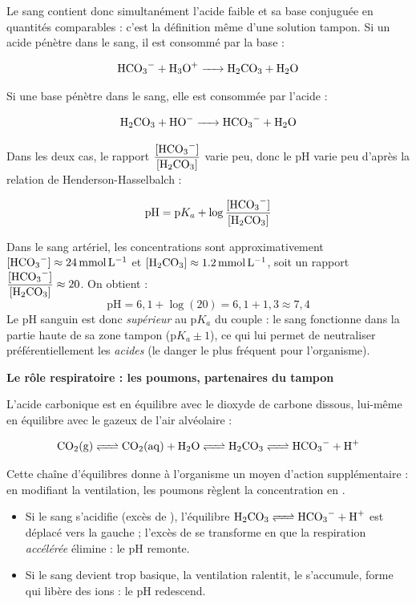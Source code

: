 \documentclass[11pt]{article}
\begin{document}
Le sang contient donc simultanément l'acide faible  et sa base conjuguée  en quantités comparables : c'est la définition même d'une solution tampon. Si un acide pénètre dans le sang, il est consommé par la base :

\[ \ce{HCO3- + H3O+ -> H2CO3 + H2O} \]

Si une base pénètre dans le sang, elle est consommée par l'acide :

\[ \ce{H2CO3 + HO- -> HCO3- + H2O} \]

Dans les deux cas, le rapport $\dfrac{[\ce{HCO3-}]}{[\ce{H2CO3}]}$ varie peu, donc le pH varie peu d'après la relation de Henderson-Hasselbalch :

\[ \mathrm{pH} = \mathrm{p}K_a + \log\frac{[\ce{HCO3-}]}{[\ce{H2CO3}]} \]

\begin{exemplebox}
Dans le sang artériel, les concentrations sont approximativement $[\ce{HCO3-}] \approx \SI{24}{mmol.L^{-1}}$ et $[\ce{H2CO3}] \approx \SI{1,2}{mmol.L^{-1}}$, soit un rapport $\dfrac{[\ce{HCO3-}]}{[\ce{H2CO3}]} \approx 20$. On obtient :
\[ \mathrm{pH} = 6,1 + \log(20) = 6,1 + 1,3 \approx 7,4 \]
Le pH sanguin est donc \emph{supérieur} au $\mathrm{p}K_a$ du couple : le sang fonctionne dans la partie haute de sa zone tampon ($\mathrm{p}K_a \pm 1$), ce qui lui permet de neutraliser préférentiellement les \emph{acides} (le danger le plus fréquent pour l'organisme).
\end{exemplebox}

\textbf{Le rôle respiratoire : les poumons, partenaires du tampon}\par
L'acide carbonique  est en équilibre avec le dioxyde de carbone dissous, lui-même en équilibre avec le  gazeux de l'air alvéolaire :

\[ \ce{CO2(g) <=> CO2(aq) + H2O <=> H2CO3 <=> HCO3- + H+} \]

Cette chaîne d'équilibres donne à l'organisme un moyen d'action supplémentaire : en modifiant la ventilation, les poumons règlent la concentration en .

\begin{itemize}
\item Si le sang s'acidifie (excès de ), l'équilibre $\ce{H2CO3 <=> HCO3- + H+}$ est déplacé vers la gauche ; l'excès de  se transforme en  que la respiration \emph{accélérée} élimine : le pH remonte.
\item Si le sang devient trop basique, la ventilation ralentit, le  s'accumule, forme  qui libère des ions  : le pH redescend.
\end{itemize}
\end{document}
